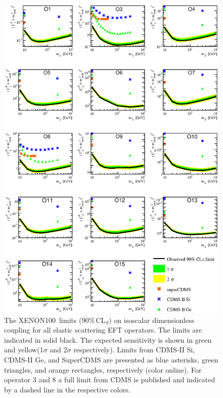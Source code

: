 \documentclass[twocolumn, showpacs, showkeys, amsmath, amssymb, amsfonts, floatfix, linenumbers]{revtex4-1}
\newcommand{\Xehund}{{XENON100}}
\begin{document}
\begin{figure}
\begin{minipage}{1.\linewidth}{}
\centerline{\includegraphics[width=\textwidth,height=0.99\textheight,keepaspectratio]{Figures/ElasticAllLimitCDMS.eps}}
\end{minipage}
\caption{The \Xehund\ limits (90\%\,CL$_S$) on isoscalar dimensionless coupling for all elastic scattering EFT operators. The limits are indicated in solid black. The expected sensitivity is shown in green and yellow(1$\sigma$ and 2$\sigma$ respectively). Limits from CDMS-II Si, CDMS-II Ge, and SuperCDMS \cite{CDMS} are presented as blue asterisks, green triangles, and orange rectangles, respectively (color online). For operator 3 and 8 a full limit from CDMS is published and indicated by a dashed line in the respective colors.}
\label{fig:elasticLimit}
\end{figure}
\end{document}
